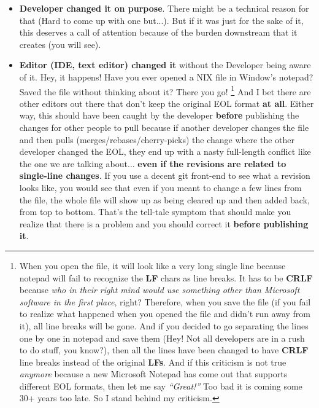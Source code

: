 \begin{itemize}
	\item {\bf Developer changed it on purpose}. There might be a technical reason for that (Hard to come up with one but...).
	But if it was just for the sake of it, this deserves a call of attention because of the burden downstream that it creates
	(you will see).
	
	\item {\bf Editor (IDE, text editor) changed it} without the Developer being aware of it. Hey, it happens! Have you ever opened
	a NIX file in Window's notepad? Saved the file without thinking about it? There you go!
	\footnote{When you open the file, it will look like a very long single line because notepad will fail to recognize the {\bf LF}
	chars as line breaks. It has to be {\bf CRLF} because {\it who in their right mind would use something other than Microsoft software
	in the first place}, right? Therefore, when you save the file (if you fail to realize what happened when you opened the file and
	didn't run away from it), all line breaks will be gone. And if you decided to go separating the lines one by one in notepad and
	save them (Hey! Not all developers are in a rush to do stuff, you know?), then all the lines have been changed to have
	{\bf CRLF} line breaks instead of the original {\bf LFs}. And if this criticism is not true {\it anymore} because a new Microsoft
	Notepad has come out that supports different EOL formats, then let me say {\it “Great!”} Too bad it is coming some 30+ years too
	late. So I stand behind my criticism.}
	And I bet there are other editors out there that don't keep the original EOL format {\bf at all}. Either way, this should have been
	caught by the developer {\bf before} publishing the changes for other people to pull because if another developer changes the file
	and then pulls (merges/rebases/cherry-picks) the change where the other developer changed the EOL, they end up with a nasty
	full-length conflict like the one we are talking about... {\bf even if the revisions are related to single-line changes}. If you use
	a decent git front-end to see what a revision looks like, you would see that even if you meant to change a few lines from the
	file, the whole file will show up as being cleared up and then added back, from top to bottom. That's the tell-tale symptom
	that should make you realize that there is a problem and you should correct it {\bf before publishing it}.
	

\end{itemize}
